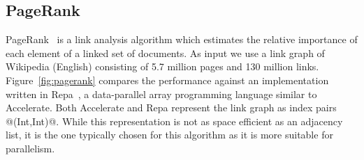 \subsection{PageRank}

PageRank~\cite{Page:pagerank} is a link analysis algorithm which
estimates the relative importance of each element of a linked set of documents. As
input we use a link graph of Wikipedia (English) consisting of 5.7 million pages
and 130 million links. Figure~\ref{fig:pagerank} compares the performance
against an implementation written in Repa~\cite{Keller:Repa,Lippmeier:Guiding},
a data-parallel array programming language similar to Accelerate. Both
Accelerate and Repa represent the link graph as index pairs @(Int,Int)@. While
this representation is not as space efficient as an adjacency list, it is the
one typically chosen for this algorithm as it is more suitable for parallelism.

